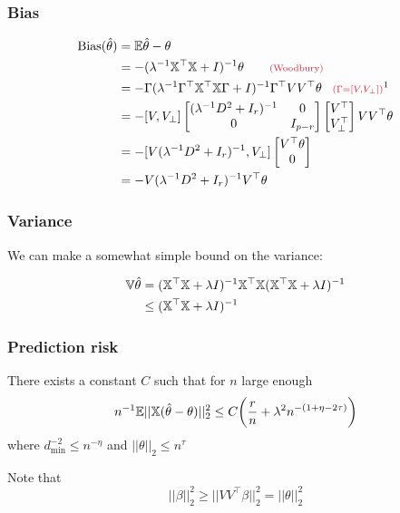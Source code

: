 \documentclass[12pt]{beamer}
\newcommand{\parenthetical}[2]{#1  \scriptstyle \alr{( #2)}}
\begin{document}
\begin{frame}
\frametitle{Bias}
\begin{align}
\textrm{Bias}(\hat\theta) 
& = 
\E \hat\theta - \theta \\
& =
-(\lambda^{-1} \X^{\top}\X + I)^{-1} \theta  \parenthetical{\qquad}{\textrm{Woodbury}}\\
& =
-\Gamma(\lambda^{-1} \Gamma^{\top}\X^{\top}\X\Gamma + I)^{-1}\Gamma^{\top} VV^{\top} \theta 
\parenthetical{\;\;\;}{\Gamma = [V, V_{\perp}]}\footnotemark\\
& = 
-[V, V_{\perp}] 
\begin{bmatrix}
(\lambda^{-1} D^2 + I_r)^{-1} & 0 \\
0 & I_{p-r}
\end{bmatrix}
\begin{bmatrix}
V^{\top} \\
V_{\perp}^{\top}
\end{bmatrix}
VV^{\top} \theta \\
& =
-[V(\lambda^{-1} D^2 + I_r)^{-1}, V_{\perp}] 
\begin{bmatrix}
V^{\top} \theta \\
0
\end{bmatrix} \\
& =
-V(\lambda^{-1} D^2 + I_r)^{-1}V^{\top} \theta
\end{align}
\end{frame}

\begin{frame}
\frametitle{Variance}
We can make a somewhat simple bound on the variance:

\begin{align}
\mathbb{V} \hat \theta 
& = 
(\mathbb{X}^{\top}\mathbb{X} + \lambda I)^{-1}\mathbb{X}^{\top}\mathbb{X} (\mathbb{X}^{\top}\mathbb{X} + \lambda I)^{-1} \\
& \leq 
(\mathbb{X}^{\top}\mathbb{X} + \lambda I)^{-1} \\
\end{align}
\end{frame}

\begin{frame}
\frametitle{Prediction risk}
\begin{theorem}
There exists a constant $C$ such that for $n$ large enough
\[
n^{-1} \mathbb{E} ||\mathbb{X}(\hat\theta - \theta)||_2^2 \leq C \bigg( \frac{r}{ n} + \lambda^2 n^{-(1+\eta - 2\tau)} \bigg)
\]
where $d_{\min}^{-2} \leq n^{-\eta}$ and $||\theta||_2 \leq n^{\tau}$
\end{theorem}
\vsp

Note that 
\[
|| \beta ||_2^2 \geq ||VV^{\top}\beta||_2^2 = ||\theta||_2^2
\]

\end{frame}
\end{document}
